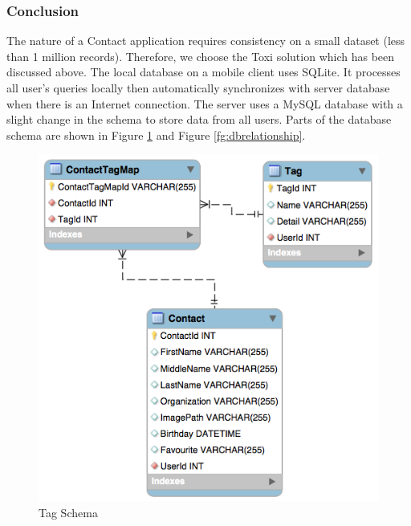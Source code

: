 \subsubsection{Conclusion}
The nature of a Contact application requires consistency on a small dataset (less than 1 million records). Therefore, we choose the Toxi \cite{toxi} solution which has been discussed above. The local database on a mobile client uses SQLite. It processes all user's queries locally then automatically synchronizes with server database when there is an Internet connection. The server uses a MySQL database with a slight change in the schema to store data from all users. Parts of the database schema are shown in Figure \ref{fg:dbtag} and Figure \ref{fg:dbrelationship}.

\begin{figure}[!h]
\begin{centering}
\includegraphics[scale=0.55]{pics/dbtag}
\caption{Tag Schema}\label{fg:dbtag}
\end{centering}
\end{figure}

